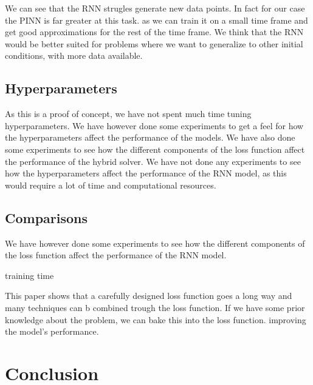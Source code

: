 \documentclass[twoside,11pt]{report}
\begin{document}
    We can see that the RNN strugles generate new data points. In fact for our case the PINN is far greater at this task.
    as we can train it on a small time frame and get good approximations for the rest of the time frame. We think 
    that the RNN would be better suited for problems where we want to generalize to other initial conditions,
    with more data available.


\subsection{Hyperparameters}
\label{sec:hyperparameters}

    As this is a proof of concept, we have not spent much time tuning hyperparameters. We have however
    done some experiments to get a feel for how the hyperparameters affect the performance of the models.
    We have also done some experiments to see how the different components of the loss function affect
    the performance of the hybrid solver. We have not done any experiments to see how the hyperparameters
    affect the performance of the RNN model, as this would require a lot of time and computational resources.



\newpage
\subsection{Comparisons}
\label{sec:comparisons}

    We have however done some experiments to see how the different components of the loss function affect
    the performance of the RNN model.

    training time

    This paper shows that a carefully designed loss function goes a long way and many techniques can b combined trough
    the loss function. If we have some prior knowledge about the problem, we can bake this into the loss function.
    improving the model's performance.


    
\section{Conclusion}
\label{sec:conclusion}
\end{document}
